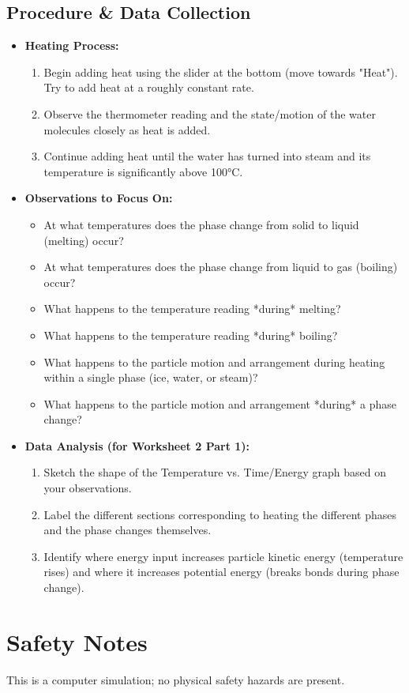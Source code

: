 \documentclass[11pt, a4paper]{article} %
\begin{document}
\subsection*{Procedure \& Data Collection}
\begin{itemize}
    \item \textbf{Heating Process:}
        \begin{enumerate}
        \item Begin adding heat using the slider at the bottom (move towards "Heat"). Try to add heat at a roughly constant rate.
        \item Observe the thermometer reading and the state/motion of the water molecules closely as heat is added.
        \item Continue adding heat until the water has turned into steam and its temperature is significantly above 100°C.
        \end{enumerate}
    \item \textbf{Observations to Focus On:}
        \begin{itemize}
            \item At what temperatures does the phase change from solid to liquid (melting) occur?
            \item At what temperatures does the phase change from liquid to gas (boiling) occur?
            \item What happens to the temperature reading *during* melting?
            \item What happens to the temperature reading *during* boiling?
            \item What happens to the particle motion and arrangement during heating within a single phase (ice, water, or steam)?
            \item What happens to the particle motion and arrangement *during* a phase change?
        \end{itemize}
    \item \textbf{Data Analysis (for Worksheet 2 Part 1):}
        \begin{enumerate}
        \item Sketch the shape of the Temperature vs. Time/Energy graph based on your observations.
        \item Label the different sections corresponding to heating the different phases and the phase changes themselves.
        \item Identify where energy input increases particle kinetic energy (temperature rises) and where it increases potential energy (breaks bonds during phase change).
        \end{enumerate}
\end{itemize}

\section*{Safety Notes}
This is a computer simulation; no physical safety hazards are present.
\end{document}
